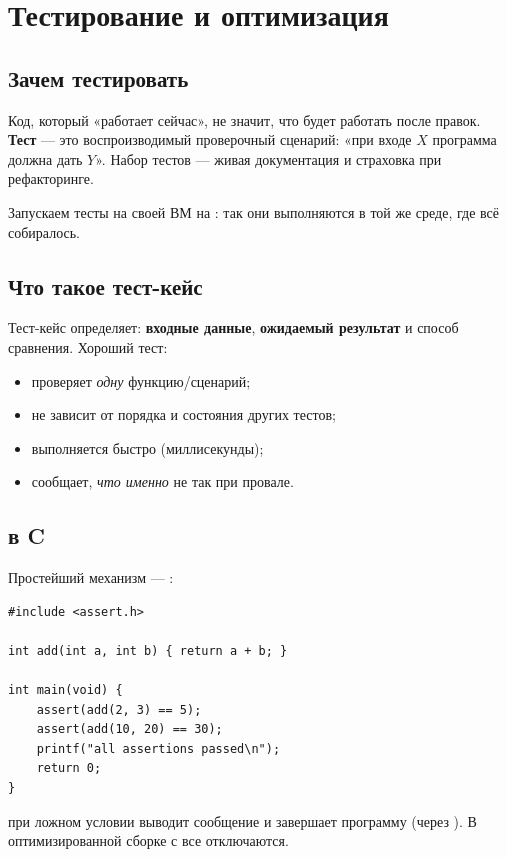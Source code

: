 \chapter{Тестирование и оптимизация}
\label{ch:15-testing-optimization}

\section{Зачем тестировать}

Код, который «работает сейчас», не значит, что будет
работать после правок. \textbf{Тест} --- это воспроизводимый
проверочный сценарий: «при входе $X$ программа должна
дать $Y$». Набор тестов --- живая документация и
страховка при рефакторинге.

Запускаем тесты на своей ВМ на : так они
выполняются в той же среде, где всё собиралось.

\section{Что такое тест-кейс}

Тест-кейс определяет: \textbf{входные данные},
\textbf{ожидаемый результат} и способ
сравнения. Хороший тест:
\begin{itemize}
  \item проверяет \emph{одну} функцию/сценарий;
  \item не зависит от порядка и состояния других тестов;
  \item выполняется быстро (миллисекунды);
  \item сообщает, \emph{что именно} не так при провале.
\end{itemize}

\section{ в C}

Простейший механизм --- :
\begin{verbatim}
#include <assert.h>

int add(int a, int b) { return a + b; }

int main(void) {
    assert(add(2, 3) == 5);
    assert(add(10, 20) == 30);
    printf("all assertions passed\n");
    return 0;
}
\end{verbatim}

 при ложном условии выводит сообщение
и завершает программу (через ). В
оптимизированной сборке с  все
 отключаются.

